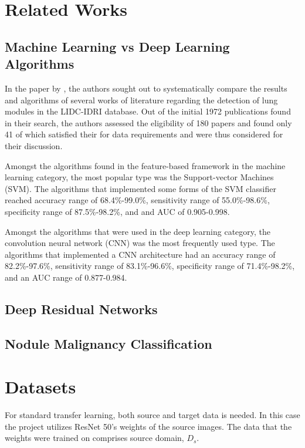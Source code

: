\documentclass[10pt,twocolumn,letterpaper]{article}
\begin{document}

\section{Related Works} \label{sec:related}

   \subsection{Machine Learning vs Deep Learning Algorithms} \label{sec:related-dl-vs-ml}
      In the paper by \cite{ml_vs_dl}, the authors sought out to systematically compare the results and algorithms of
      several works of literature regarding the detection of lung modules in the LIDC-IDRI database.
      Out of the initial 1972 publications found in their search, the authors assessed the eligibility of 180 papers
      and found only 41 of which satisfied their for data requirements and were thus considered for their discussion.

      Amongst the algorithms found in the feature-based framework in the machine learning category, the most popular
      type was the Support-vector Machines (SVM). The algorithms that implemented some forms of the SVM classifier
      reached accuracy range of 68.4\%-99.0\%, sensitivity range of 55.0\%-98.6\%, specificity range of 87.5\%-98.2\%, and
      and AUC of 0.905-0.998.

      Amongst the algorithms that were used in the deep learning category, the convolution neural network (CNN) was the most
      frequently used type. The algorithms that implemented a CNN architecture had an accuracy range of 82.2\%-97.6\%,
      sensitivity range of 83.1\%-96.6\%, specificity range of 71.4\%-98.2\%, and an AUC range of 0.877-0.984.



   \subsection{Deep Residual Networks} \label{sec:related-deep-residual-networks}


   \subsection{Nodule Malignancy Classification} \label{sec:related-nodulex}


\section{Datasets} \label{sec:data}
   For standard transfer learning, both source and target data is needed. In this case
   the project utilizes ResNet 50's weights of the source images. The data that the weights
   were trained on comprises source domain, $D_s$.
\end{document}
